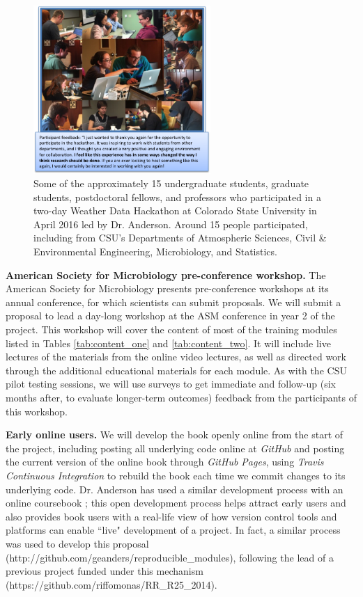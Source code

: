 \documentclass[pdftex,english,11.5pt,parskip=half]{scrartcl}
\begin{document}
\begin{figure} \centering \includegraphics[width =
0.6\textwidth]{figures/csu_hackathon.png} \caption{Some of the approximately 15
undergraduate students, graduate students, postdoctoral fellows, and professors
who participated in a two-day Weather Data Hackathon at Colorado State
University in April 2016 led by Dr. Anderson. Around 15 people participated, including from CSU's Departments of
Atmospheric Sciences, Civil \& Environmental Engineering, Microbiology, and
Statistics. } \label{csu-r-hackathon}
\end{figure}

\textbf{American Society for Microbiology pre-conference workshop.}
The American Society for Microbiology presents pre-conference workshops at its annual 
conference, for which scientists can submit proposals. We will submit a proposal 
to lead a day-long workshop at the ASM conference in year 2 of the project. This 
workshop will cover the content of most of the training modules listed in Tables
\ref*{tab:content_one} and \ref*{tab:content_two}. It will include live lectures of the 
materials from the online video lectures, as well as directed work through the 
additional educational materials for each module. As with the CSU pilot testing sessions, we will use surveys to get immediate and follow-up (six months after, to evaluate longer-term outcomes) feedback from 
the participants of this workshop.

\textbf{Early online users.}  We will develop the book openly online from the start of 
the project, including posting all underlying code online at \textit{GitHub} and 
posting the current version of the online book through \textit{GitHub Pages}, using 
\textit{Travis Continuous Integration} to rebuild the book each time we commit 
changes to its underlying code. Dr. Anderson has used a similar development process
with an online coursebook \cite{andersoncoursebook}; this open development process
helps attract early users and also provides book users with a real-life view of how 
version control tools and platforms can enable ``live" development of a project. In fact, a similar process was used to develop this proposal (http://github.com/geanders/reproducible\_modules), following the lead of a previous project funded under this mechanism (https://github.com/riffomonas/RR\_R25\_2014).
\end{document}

